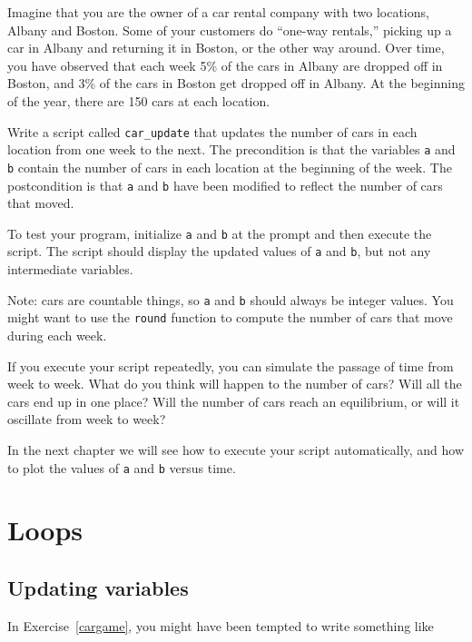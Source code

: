 \documentclass{book}
\begin{document}
\begin{ex}
\label{cargame}

Imagine that you are the owner of a car rental company with two
locations, Albany and Boston.  Some of your customers do ``one-way
rentals,'' picking up a car in Albany and returning it in Boston, or
the other way around.  Over time, you have observed that each week 5\%
of the cars in Albany are dropped off in Boston, and 3\% of the cars
in Boston get dropped off in Albany.
At the beginning of the year, there are 150 cars at each location.

Write a script called {\tt car\_update} that updates the number
of cars in each location from one week to the next.  The precondition
is that the variables {\tt a} and {\tt b} contain the number of cars
in each location at the beginning of the week.  The postcondition
is that {\tt a} and {\tt b} have been modified to reflect the number
of cars that moved.

To test your program, initialize {\tt a} and {\tt b} at
the prompt and then execute the script.  The script should display
the updated values of {\tt a} and {\tt b}, but not any intermediate
variables.

Note: cars are countable things, so {\tt a} and {\tt b} should always
be integer values.  You might want to use the {\tt round} function
to compute the number of cars that move during each week.

If you execute your script repeatedly, you can simulate the passage
of time from week to week.  What do you think will happen to the
number of cars?  Will all the cars end up in one place?  Will the
number of cars reach an equilibrium, or will it oscillate from week
to week?

In the next chapter we will see how to execute your script automatically,
and how to plot the values of {\tt a} and {\tt b} versus time.
\end{ex}



\chapter{Loops}

\section{Updating variables}

In Exercise~\ref{cargame}, you might have been tempted to write something
like
\end{document}
